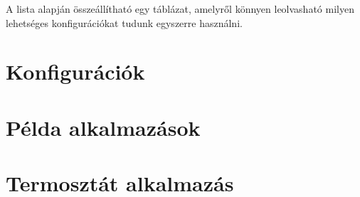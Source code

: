 A lista alapján összeállítható egy táblázat, amelyről könnyen leolvasható milyen lehetséges konfigurációkat tudunk egyszerre használni.

\section{Konfigurációk}


\section{Példa alkalmazások}


\section{Termosztát alkalmazás}
